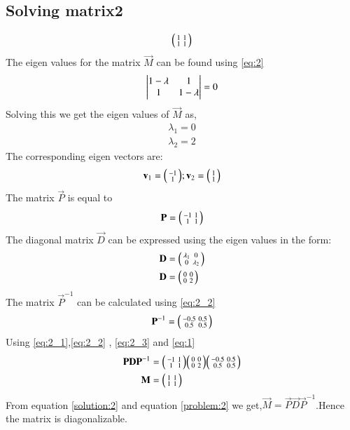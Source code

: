 \documentclass[journal,12pt,twocolumn]{IEEEtran}
\begin{document}
\subsection{Solving matrix2}
\begin{align}
	\begin{psmallmatrix}1&1\\1&1\end{psmallmatrix}\label{problem:2}
\end{align}
The eigen values for the matrix $\vec{M}$ can be found using \eqref{eq:2}
\begin{align}
	\begin{vmatrix}1- \lambda &  1\\1& 1-\lambda\end{vmatrix}=0
\end{align}
Solving this we get the eigen values of $\vec{M}$ as, 
\begin{align}
	\lambda_1 = 0\\
	\lambda_2=  2
\end{align}
The corresponding eigen vectors are:
\begin{align}
	\mathbf v_1 = \begin{psmallmatrix}-1\\ 1\end{psmallmatrix};
	\mathbf v_2 = \begin{psmallmatrix}1\\ 1\end{psmallmatrix}
\end{align}
The matrix $\vec{P}$ is equal to
\begin{align}
	\mathbf{P}=\begin{psmallmatrix}-1&1\\1&1\end{psmallmatrix}\label{eq:2_1}
\end{align}
The diagonal matrix $\vec{D}$ can be expressed using the eigen values in the form:
\begin{align}
	\mathbf{D}&=\begin{psmallmatrix}\lambda_1&0\\0&\lambda_2\end{psmallmatrix}\\
		\mathbf{D} &=\begin{psmallmatrix}0&0\\0&2\end{psmallmatrix}\label{eq:2_2}
\end{align}
The matrix $\vec{P}^{-1}$ can be calculated using \eqref{eq:2_2}
\begin{align}
	\mathbf{P}^{-1}=\begin{psmallmatrix}-0.5&0.5\\0.5&0.5\end{psmallmatrix}\label{eq:2_3}
\end{align}
Using \eqref{eq:2_1},\eqref{eq:2_2} , \eqref{eq:2_3} and \eqref{eq:1}
\begin{align}
	\mathbf{P}\mathbf{D}\mathbf{P}^{-1}&=\begin{psmallmatrix}-1&1\\1&1\end{psmallmatrix}\begin{psmallmatrix}0&0\\0&2\end{psmallmatrix}\begin{psmallmatrix}-0.5&0.5\\0.5&0.5\end{psmallmatrix}\\
	\mathbf{M}&=\begin{psmallmatrix}1&1\\1&1\end{psmallmatrix}\label{solution:2}	
\end{align}
From equation \eqref{solution:2} and equation \eqref{problem:2} we get,$\vec{M} = \vec{P}\vec{D}\vec{P}^{-1}$.Hence the matrix is diagonalizable. 
\end{document}
